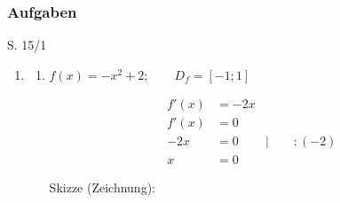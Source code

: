 
\subsubsection{Aufgaben}

\begin{Exercise}{S. 15/1}{}
    \begin{enumerate}
        \item \begin{enumerate}[label=\alph*)]
            \item[c)] {
                $f(x) = -x^2 + 2; \qquad D_{f} = \left[ -1; 1 \right]$\\[2.0ex]
                \begin{minipage}[t]{0.30\linewidth}
                    \vspace{-0.80cm}
                    \begin{align*}
                        f'(x) &= -2x & \\[2.0ex]
                        f'(x) &= 0 & \\[1.0ex]
                        -2 x &= 0 & | \qquad :(-2)\\[1.0ex]
                        x &= 0 &
                    \end{align*}
                \end{minipage}
                \hspace{1.5cm}
                \begin{minipage}[t]{0.30\linewidth}
                    Skizze (Zeichnung):\\{
                    }
\end{minipage}}
\end{enumerate}
\end{enumerate}
\end{Exercise}

